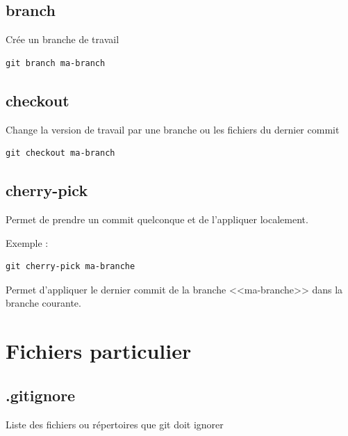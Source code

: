 \documentclass[a4paper]{article}
\begin{document}
\subsection*{branch}
Crée un branche de travail
\begin{verbatim}
git branch ma-branch
\end{verbatim}

\subsection*{checkout}
Change la version de travail par une branche ou les fichiers du dernier commit
\begin{verbatim}
git checkout ma-branch
\end{verbatim}

\subsection*{cherry-pick}
Permet de prendre un commit quelconque et de l'appliquer localement.

Exemple : 
\begin{verbatim}
git cherry-pick ma-branche
\end{verbatim}
Permet d'appliquer le dernier commit de la branche <<ma-branche>> dans la branche courante.

\section{Fichiers particulier}

\subsection*{.gitignore}
Liste des fichiers ou répertoires que git doit ignorer
\end{document}

